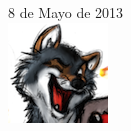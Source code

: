 \begin{titlepage}


{\large 8 de Mayo de 2013}\\[3cm] %


\includegraphics{RalvrWuff_Icon}\\[1cm] %
 

\vfill %

\end{titlepage}